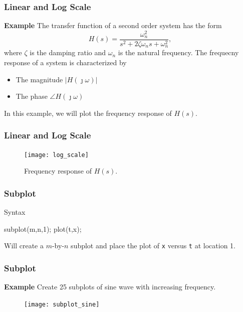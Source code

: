 \documentclass{beamer}  %
\begin{document}
\begin{frame}[fragile]
\frametitle{Linear and Log Scale}
\textbf{Example} 
The transfer function of a second order system has the form
$$H(s) = \frac{\omega_n^2}{s^2 + 2 \zeta \omega_n s + \omega_n^2},$$
where $\zeta$ is the damping ratio and $\omega_n$ is the natural frequency.
\pause
The frequecny response of a system is characterized by
\begin{itemize}
    \item The magnitude $|H(\jmath \omega)|$
    \item The phase $\angle H(\jmath \omega)$
\end{itemize}

In this example, we will plot the frequency response of $H(s)$.

\end{frame}
\begin{frame}[fragile]
\frametitle{Linear and Log Scale}

\setcounter{subfigure}{0}
\begin{figure}
    \centering
   \texttt{[image: log\_scale]}
    \caption{Frequency response of $H(s)$.}
\end{figure}

\end{frame}
\begin{frame}[fragile]
\frametitle{Subplot}

\begin{block}{Syntax}
          \begin{matlabcodebeamer}[frame=none]
          subplot(m,n,1);
          plot(t,x);
          \end{matlabcodebeamer}
Will create a $m$-by-$n$ subplot and place the plot of \texttt{x} versus \texttt{t} at location 1.
\end{block}
\end{frame}
\begin{frame}[fragile]
\frametitle{Subplot}
\textbf{Example} 
Create 25 subplots of sine wave with increasing frequency.
\setcounter{subfigure}{0}
\begin{figure}
    \centering
   \texttt{[image: subplot\_sine]}
\end{figure}

\end{frame}
\end{document}
